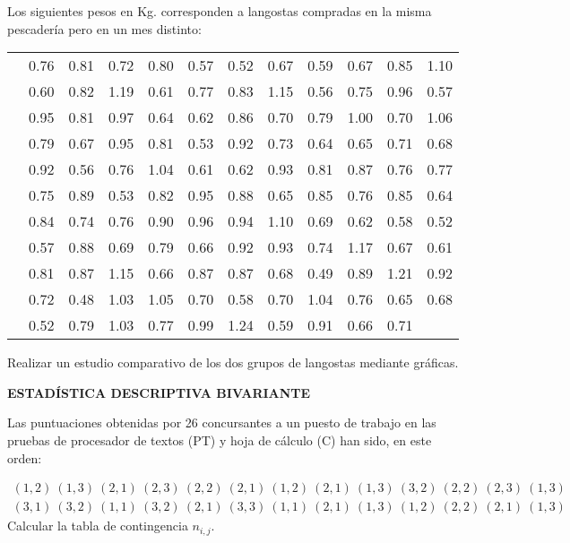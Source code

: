 \documentclass[12pt]{article}
\begin{document}
\begin{prob}
Los siguientes pesos en Kg. corresponden a langostas  compradas en la misma
pescadería pero en un mes distinto:

\begin{tabular}{cccccccccccc}
  & 0.76   & 0.81   & 0.72   & 0.80   & 0.57   & 0.52   & 0.67   &
    0.59   & 0.67   & 0.85   & 1.10 \\
  & 0.60   & 0.82   & 1.19   & 0.61   & 0.77   & 0.83   & 1.15   &
    0.56   & 0.75   & 0.96   & 0.57 \\
  & 0.95   & 0.81   & 0.97   & 0.64   & 0.62   & 0.86   & 0.70   &
    0.79   & 1.00   & 0.70   & 1.06 \\
  & 0.79   & 0.67   & 0.95   & 0.81   & 0.53   & 0.92   & 0.73   &
    0.64   & 0.65   & 0.71   & 0.68 \\
  & 0.92   & 0.56   & 0.76   & 1.04   & 0.61   & 0.62   & 0.93   &
    0.81   & 0.87   & 0.76   & 0.77 \\
  & 0.75   & 0.89   & 0.53   & 0.82   & 0.95   & 0.88   & 0.65   &
    0.85   & 0.76   & 0.85   & 0.64 \\
  & 0.84   & 0.74   & 0.76   & 0.90   & 0.96   & 0.94   & 1.10   &
    0.69   & 0.62   & 0.58   & 0.52 \\
  & 0.57   & 0.88   & 0.69   & 0.79   & 0.66   & 0.92   & 0.93   &
    0.74   & 1.17   & 0.67   & 0.61 \\
  & 0.81   & 0.87   & 1.15   & 0.66   & 0.87   & 0.87   & 0.68   &
    0.49   & 0.89   & 1.21   & 0.92 \\
  & 0.72   & 0.48   & 1.03   & 1.05   & 0.70   & 0.58   & 0.70   &
    1.04   & 0.76   & 0.65   & 0.68 \\
  & 0.52   & 0.79 &   1.03   & 0.77   & 0.99   & 1.24   & 0.59   &
    0.91   & 0.66   & 0.71
\end{tabular}

  Realizar un  estudio comparativo de los dos grupos de langostas
  mediante gráficas.
\end{prob}

\begin{centerline}
{{\bf ESTAD\'ISTICA DESCRIPTIVA BIVARIANTE}}
\end{centerline}


\begin{prob}
{Las puntuaciones obtenidas por 26 concursantes  a un puesto  de trabajo en las pruebas
de procesador de textos (PT) y  hoja de cálculo (C) han sido, en este orden:

$$
\begin{array}{l}
(1,2)\ (1,3)\  (2,1)\  (2,3)\ (2,2)\  (2,1)\  (1,2)\  (2,1)\
(1,3)\  (3,2)\  (2,2)\  (2,3)\  (1,3)\
\\  (3,1)\
(3,2)\  (1,1)\  (3,2)\  (2,1) \  (3,3)\  (1,1)\  (2,1)\  (1,3)\
(1,2)\ (2,2)\  (2,1)\  (1,3)
\end{array}
$$
Calcular la tabla de contingencia $n_{i,j}$.}
\end{prob}
\end{document}
